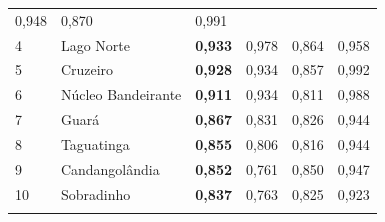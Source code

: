 \begin{center}
\begin{table}[]
\begin{tabular}{llllll}
            {\color[HTML]{202122} 0,948} &
            {\color[HTML]{202122} 0,870} &
            {\color[HTML]{202122} 0,991} \\
            \rowcolor[HTML]{F8F9FA}
            {\color[HTML]{202122} 4} &
            {\color[HTML]{0B0080} Lago Norte} &
            {\color[HTML]{202122} \textbf{0,933}} &
            {\color[HTML]{202122} 0,978} &
            {\color[HTML]{202122} 0,864} &
            {\color[HTML]{202122} 0,958} \\
            \rowcolor[HTML]{F8F9FA}
            {\color[HTML]{202122} 5} &
            {\color[HTML]{0B0080} Cruzeiro} &
            {\color[HTML]{202122} \textbf{0,928}} &
            {\color[HTML]{202122} 0,934} &
            {\color[HTML]{202122} 0,857} &
            {\color[HTML]{202122} 0,992} \\
            \rowcolor[HTML]{F8F9FA}
            {\color[HTML]{202122} 6} &
            {\color[HTML]{0B0080} Núcleo Bandeirante} &
            {\color[HTML]{202122} \textbf{0,911}} &
            {\color[HTML]{202122} 0,934} &
            {\color[HTML]{202122} 0,811} &
            {\color[HTML]{202122} 0,988} \\
            \rowcolor[HTML]{F8F9FA}
            {\color[HTML]{202122} 7} &
            {\color[HTML]{0B0080} Guará} &
            {\color[HTML]{202122} \textbf{0,867}} &
            {\color[HTML]{202122} 0,831} &
            {\color[HTML]{202122} 0,826} &
            {\color[HTML]{202122} 0,944} \\
            \rowcolor[HTML]{F8F9FA}
            {\color[HTML]{202122} 8} &
            {\color[HTML]{0B0080} Taguatinga} &
            {\color[HTML]{202122} \textbf{0,855}} &
            {\color[HTML]{202122} 0,806} &
            {\color[HTML]{202122} 0,816} &
            {\color[HTML]{202122} 0,944} \\
            \rowcolor[HTML]{F8F9FA}
            {\color[HTML]{202122} 9} &
            {\color[HTML]{0B0080} Candangolândia} &
            {\color[HTML]{202122} \textbf{0,852}} &
            {\color[HTML]{202122} 0,761} &
            {\color[HTML]{202122} 0,850} &
            {\color[HTML]{202122} 0,947} \\
            \rowcolor[HTML]{F8F9FA}
            {\color[HTML]{202122} 10} &
            {\color[HTML]{0B0080} Sobradinho} &
            {\color[HTML]{202122} \textbf{0,837}} &
            {\color[HTML]{202122} 0,763} &
            {\color[HTML]{202122} 0,825} &
            {\color[HTML]{202122} 0,923} \\
            \rowcolor[HTML]{F8F9FA}

\end{tabular}
\end{table}
\end{center}
